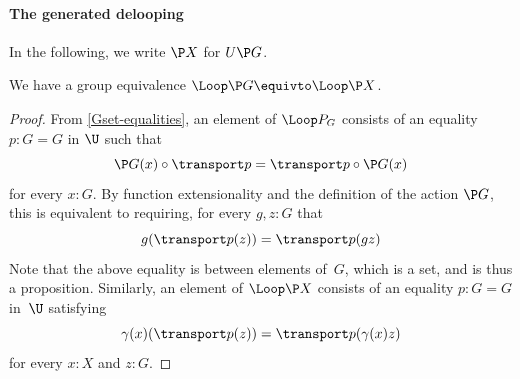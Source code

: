 \paragraph{The generated delooping}
In the following, we write $\P X$ for $U\P G$.

\begin{proposition}
  \label{PG-loop-restriction}
  We have a group equivalence
  $
  \Loop\P G\equivto\Loop \P X
  $.
\end{proposition}
\begin{proof}
  From \cref{Gset-equalities}, an element of $\Loop P_G$ consists of an equality
  $p:G=G$ in $\U$ such that
  \[
    \P G(x)\circ\transport p=\transport p\circ\P G(x)
  \]
  for every $x:G$. By function extensionality and the definition of the action $\P G$, this is equivalent to
  requiring, for every $g,z:G$ that
  \begin{equation}
    \label{eq:PG-condition}
    g(\transport p(z))=\transport p(gz)
  \end{equation}
  Note that the above equality is between elements of~$G$, which is a set, and is
  thus a proposition.
  Similarly, an element of $\Loop \P X$ consists of an equality $p:G=G$
  in~$\U$ satisfying
  \begin{equation}
    \label{eq:PX-condition}
    \gamma(x)(\transport p(z))=\transport p(\gamma(x)z)
  \end{equation}
  for every $x:X$ and $z:G$.


\end{proof}
